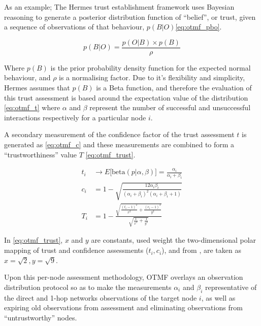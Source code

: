 \documentclass{aamas2016}
\begin{document}
As an example; The Hermes trust establishment framework \cite{Zouridaki2005} uses Bayesian reasoning to generate a posterior distribution function of ``belief'', or trust, given a sequence of observations of that behaviour, $p(B|O)$\eqref{eq:otmf_pbo}.

\begin{equation}
p(B|O)  = \frac{p(O|B) \times p(B)}{\rho}
\label{eq:otmf_pbo}
\end{equation}

Where $p(B)$ is the prior probability density function for the expected normal behaviour, and $\rho$ is a normalising factor.
Due to it's flexibility and simplicity, Hermes assumes that $p(B)$ is a Beta function, and therefore the evaluation of this trust assessment is based around the expectation value of the distribution \eqref{eq:otmf_t}  where $\alpha$ and $\beta$ represent the number of successful and unsuccessful interactions respectively for a particular node $i$.

A secondary measurement of the confidence factor of the trust assessment $t$ is generated as \eqref{eq:otmf_c} and these measurements are combined to form a ``trustworthiness'' value $T$ \eqref{eq:otmf_trust}.

\begin{align}
t_i &\to E\lbrack\text{beta}(p|\alpha,\beta)\rbrack = \frac{\alpha_i}{\alpha_i+\beta_i} \label{eq:otmf_t}\\[5pt]
c_i &= 1 - \sqrt{\frac{12\alpha_i\beta_i}{(\alpha_i+\beta_i)^2(\alpha_i+\beta_i+1)}} \label{eq:otmf_c}\\[5pt]
T_i &= 1 - \frac{\sqrt{\frac{(t_i-1)^2}{x^2} + \frac{(c_i-1)^2}{y^2}}}{\sqrt{\frac{1}{x^2}+\frac{1}{y^2}}} \label{eq:otmf_trust}
\end{align}

In \eqref{eq:otmf_trust}, $x$ and $y$ are constants, used weight the two-dimensional polar mapping of trust and confidence assessments ($t_i,c_i$), and from \cite{Zouridaki2005}, are taken as $x=\sqrt{2},y=\sqrt{9}$.

Upon this per-node assessment methodology, OTMF overlays an observation distribution protocol so as to make the measurements $\alpha_i$ and $\beta_i$ representative of the direct and 1-hop networks observations of the target node $i$, as well as expiring old observations from assessment and eliminating observations from ``untrustworthy'' nodes.
\end{document}
